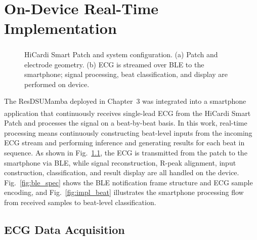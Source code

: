 \clearpage
 

\chapter{On-Device Real-Time Implementation}
\label{ch:implementation}

\begin{figure}[t]
\centering

\caption[HiCardi\textsuperscript{\textregistered} Smart Patch and system configuration.]{
HiCardi\textsuperscript{\textregistered} Smart Patch and system configuration.
(a) Patch and electrode geometry.
(b) ECG is streamed over BLE to the smartphone;
signal processing, beat classification, and display are performed on device.
}
\label{fig:impl_overview}
\end{figure}
The ResDSUMamba deployed in Chapter~3 was integrated into a smartphone application that continuously receives single-lead ECG from the HiCardi\textsuperscript{\textregistered} Smart Patch and processes the signal on a beat-by-beat basis.
In this work, real-time processing means continuously constructing beat-level inputs from the incoming ECG stream and performing inference and generating results for each beat in sequence.
As shown in Fig.~\ref{fig:impl_overview}, the ECG is transmitted from the patch to the smartphone via BLE, while signal reconstruction, R-peak alignment, input construction, classification, and result display are all handled on the device.
Fig.~\ref{fig:ble_spec} shows the BLE notification frame structure and ECG sample encoding, and Fig.~\ref{fig:impl_beat} illustrates the smartphone processing flow from received samples to beat-level classification.

\section{ECG Data Acquisition}

